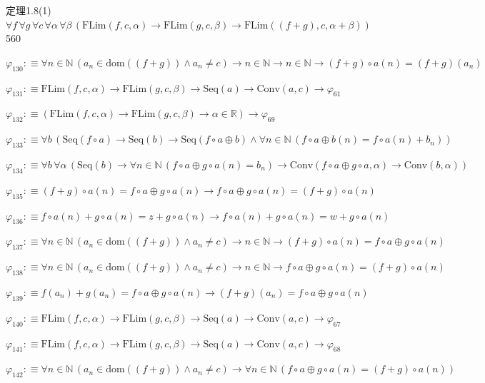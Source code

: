 \begin{fullproof}{定理1.8(1)}{$\forall f\,\forall g\,\forall c\,\forall \alpha\,\forall \beta\,(\mathrm{FLim}(f,c,\alpha) \to \mathrm{FLim}(g,c,\beta) \to \mathrm{FLim}((f + g),c,\alpha + \beta))$}{560}
\begin{abbrevlist}
\item $\varphi_{130} :\equiv \forall n \in \mathbb{N}\,(a_{n} \in \mathrm{dom}((f + g)) \land a_{n} \neq c) \to n \in \mathbb{N} \to n \in \mathbb{N} \to (f + g) \circ a(n) = (f + g)(a_{n})$
\item $\varphi_{131} :\equiv \mathrm{FLim}(f,c,\alpha) \to \mathrm{FLim}(g,c,\beta) \to \mathrm{Seq}(a) \to \mathrm{Conv}(a,c) \to \varphi_{61}$
\item $\varphi_{132} :\equiv (\mathrm{FLim}(f,c,\alpha) \to \mathrm{FLim}(g,c,\beta) \to \alpha \in \mathbb{R}) \to \varphi_{69}$
\item $\varphi_{133} :\equiv \forall b\,(\mathrm{Seq}(f \circ a) \to \mathrm{Seq}(b) \to \mathrm{Seq}(f \circ a \oplus b) \land \forall n \in \mathbb{N}\,(f \circ a \oplus b(n) = f \circ a(n) + b_{n}))$
\item $\varphi_{134} :\equiv \forall b\,\forall \alpha\,(\mathrm{Seq}(b) \to \forall n \in \mathbb{N}\,(f \circ a \oplus g \circ a(n) = b_{n}) \to \mathrm{Conv}(f \circ a \oplus g \circ a,\alpha) \to \mathrm{Conv}(b,\alpha))$
\item $\varphi_{135} :\equiv (f + g) \circ a(n) = f \circ a \oplus g \circ a(n) \to f \circ a \oplus g \circ a(n) = (f + g) \circ a(n)$
\item $\varphi_{136} :\equiv f \circ a(n) + g \circ a(n) = z + g \circ a(n) \to f \circ a(n) + g \circ a(n) = w + g \circ a(n)$
\item $\varphi_{137} :\equiv \forall n \in \mathbb{N}\,(a_{n} \in \mathrm{dom}((f + g)) \land a_{n} \neq c) \to n \in \mathbb{N} \to (f + g) \circ a(n) = f \circ a \oplus g \circ a(n)$
\item $\varphi_{138} :\equiv \forall n \in \mathbb{N}\,(a_{n} \in \mathrm{dom}((f + g)) \land a_{n} \neq c) \to n \in \mathbb{N} \to f \circ a \oplus g \circ a(n) = (f + g) \circ a(n)$
\item $\varphi_{139} :\equiv f(a_{n}) + g(a_{n}) = f \circ a \oplus g \circ a(n) \to (f + g)(a_{n}) = f \circ a \oplus g \circ a(n)$
\item $\varphi_{140} :\equiv \mathrm{FLim}(f,c,\alpha) \to \mathrm{FLim}(g,c,\beta) \to \mathrm{Seq}(a) \to \mathrm{Conv}(a,c) \to \varphi_{67}$
\item $\varphi_{141} :\equiv \mathrm{FLim}(f,c,\alpha) \to \mathrm{FLim}(g,c,\beta) \to \mathrm{Seq}(a) \to \mathrm{Conv}(a,c) \to \varphi_{68}$
\item $\varphi_{142} :\equiv \forall n \in \mathbb{N}\,(a_{n} \in \mathrm{dom}((f + g)) \land a_{n} \neq c) \to \forall n \in \mathbb{N}\,(f \circ a \oplus g \circ a(n) = (f + g) \circ a(n))$

\end{abbrevlist}
\end{fullproof}
